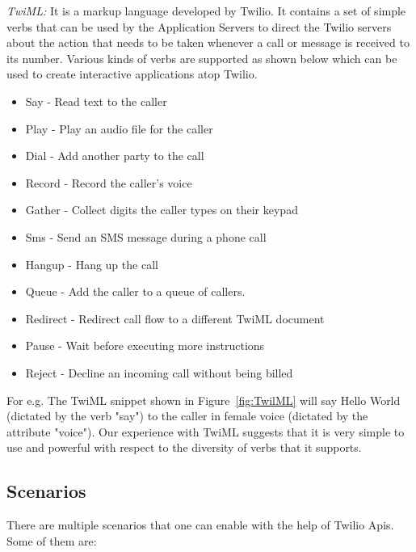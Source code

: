 \emph{TwiML:  } It is a markup language developed by Twilio. It contains a set of simple verbs that can be used by the Application Servers to direct the Twilio servers about the action that needs to be taken whenever a call or message is received to its number. Various kinds of verbs are supported as shown below which can be used to create interactive applications atop Twilio.
\begin{itemize}
\item Say - Read text to the caller 
\item Play - Play an audio file for the caller
\item Dial - Add another party to the call
\item Record - Record the caller's voice
\item Gather - Collect digits the caller types on their keypad
\item Sms - Send an SMS message during a phone call
\item Hangup - Hang up the call
\item Queue - Add the caller to a queue of callers.
\item Redirect - Redirect call flow to a different TwiML document
\item Pause - Wait before executing more instructions
\item Reject - Decline an incoming call without being billed
\end{itemize}

For e.g. The TwiML snippet shown in Figure~\ref{fig:TwilML} will say Hello World (dictated by the verb "say") to the caller in female voice (dictated by the attribute "voice"). Our experience with TwiML suggests that it is very simple to use and powerful with respect to the diversity of verbs that it supports.



\subsection{Scenarios}

There are multiple scenarios that one can enable with the help of Twilio Apis. Some of them are:

